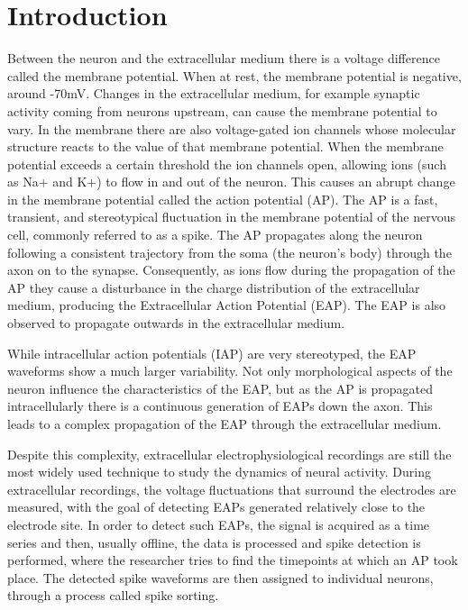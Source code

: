 \section{Introduction}
\label{sec:introduction}

Between the neuron and the extracellular medium there is a voltage difference called the membrane potential. When at rest, the membrane potential is negative, around -70mV. Changes in the extracellular medium, for example synaptic activity coming from neurons upstream, can cause the membrane potential to vary. In the membrane there are also voltage-gated ion channels whose molecular structure reacts to the value of that membrane potential. When the membrane potential exceeds a certain threshold the ion channels open, allowing ions (such as Na+ and K+) to flow in and out of the neuron. This causes an abrupt change in the membrane potential called the action potential (AP). The AP is a fast, transient, and stereotypical fluctuation in the membrane potential of the nervous cell, commonly referred to as a spike. The AP propagates along the neuron following a consistent trajectory from the soma (the neuron's body) through the axon on to the synapse. 
Consequently, as ions flow during the propagation of the AP they cause a disturbance in the charge distribution of the extracellular medium, producing the Extracellular Action Potential (EAP). The EAP is also observed to propagate outwards in the extracellular medium. \cite{kandel}

While intracellular action potentials (IAP) are very stereotyped, the EAP waveforms show a much larger variability. Not only morphological aspects of the neuron influence the characteristics of the EAP, but as the AP is propagated intracellularly there is a continuous generation of EAPs down the axon. This leads to a complex propagation of the EAP through the extracellular medium. \cite{gold2007biophysics} \cite{pettersen2008amplitude}
 
Despite this complexity, extracellular electrophysiological recordings are still the most widely used technique to study the dynamics of neural activity. During extracellular recordings, the voltage fluctuations that surround the electrodes are measured, with the goal of detecting EAPs generated relatively close to the electrode site. In order to detect such EAPs, the signal is acquired as a time series and then, usually offline, the data is processed and spike detection is performed, where the researcher tries to find the timepoints at which an AP took place. The detected spike waveforms are then assigned to individual neurons, through a process called spike sorting.

